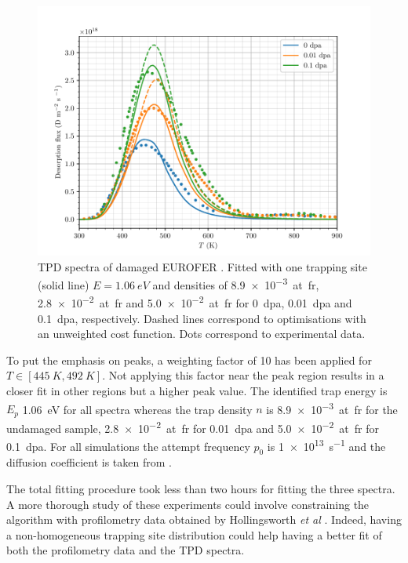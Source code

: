 \begin{figure} [ht]
    \centering
    \includegraphics[width=\linewidth]{Figures/Chapter3/Parametric_optimisation/EUROFER_hollingsworth.pdf}
    \caption{TPD spectra of damaged EUROFER \cite{hollingsworth_comparative_2019}. Fitted with one trapping site (solid line) $E=\SI{1.06}{eV}$ and densities of \SI{8.9e-3}{at.fr}, \SI{2.8e-2}{at.fr} and \SI{5.0e-2}{at.fr} for \SI{0}{dpa}, \SI{0.01}{dpa} and \SI{0.1}{dpa}, respectively. Dashed lines correspond to optimisations with an unweighted cost function. Dots correspond to experimental data.}
    \label{fig:TPD EUROFER}
\end{figure}

To put the emphasis on peaks, a weighting factor of 10 has been applied for $T \in [\SI{445}{K}, \SI{492}{K}]$.
Not applying this factor near the peak region results in a closer fit in other regions but a higher peak value.
The identified trap energy is $E_p$ \SI{1.06}{eV} for all spectra whereas the trap density $n$ is \SI{8.9e-3}{at.fr} for the undamaged sample, \SI{2.8e-2}{at.fr} for \SI{0.01}{dpa} and \newline \SI{5.0e-2}{at.fr} for \SI{0.1}{dpa}.
For all simulations the attempt frequency $p_0$ is \SI{1e13}{s^{-1}} and the diffusion coefficient is taken from .

The total fitting procedure took less than two hours for fitting the three spectra.
A more thorough study of these experiments could involve constraining the algorithm with profilometry data obtained by Hollingsworth \textit{et al} \cite{hollingsworth_comparative_2019}.
Indeed, having a non-homogeneous trapping site distribution could help having a better fit of both the profilometry data and the TPD spectra. 

